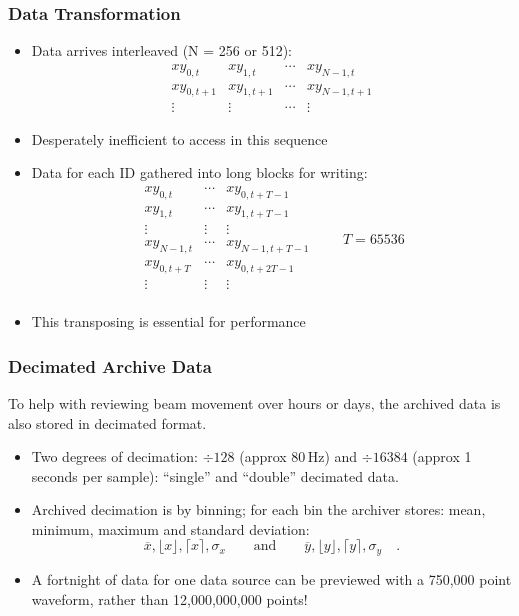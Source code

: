 \documentclass{beamer}
\begin{document}
\begin{frame}\frametitle{Data Transformation}
\begin{itemize}
\item Data arrives interleaved (N = 256 or 512):
\[
\begin{matrix}
xy_{0,t}   & xy_{1, t}   & \cdots & xy_{N-1,t} \\
xy_{0,t+1} & xy_{1, t+1} & \cdots & xy_{N-1,t+1} \\
\vdots & \vdots & \cdots & \vdots
\end{matrix}
\]
\item Desperately inefficient to access in this sequence
\item Data for each ID gathered into long blocks for writing:
\[
\begin{matrix}
xy_{0,t} & \cdots & xy_{0,t+T-1} \\
xy_{1,t} & \cdots & xy_{1,t+T-1} \\
\vdots & \vdots & \vdots \\
xy_{N-1,t} & \cdots & xy_{N-1,t+T-1} \\
xy_{0,t+T} & \cdots & xy_{0,t+2T-1} \\
\vdots & \vdots & \vdots \\
\end{matrix}
\qquad T = 65536
\]
\item This transposing is essential for performance
\end{itemize}

\end{frame}


\begin{frame}\frametitle{Decimated Archive Data}
To help with reviewing beam movement over hours or days, the archived data is
also stored in decimated format.
\begin{itemize}
\item Two degrees of decimation: $\div 128$ (approx 80\,Hz) and $\div 16384$
(approx 1\textonehalf{} seconds per sample): ``single'' and ``double'' decimated
data.
\item Archived decimation is by binning; for each bin the archiver stores: mean,
minimum, maximum and standard deviation:
\[
\overline{x}, \lfloor x\rfloor, \lceil x\rceil, \sigma_x
\qquad\text{and}\qquad
\overline{y}, \lfloor y\rfloor, \lceil y\rceil, \sigma_y
\quad.
\]
\item A fortnight of data for one data source can be previewed with a 750,000
point waveform, rather than 12,000,000,000 points!
\end{itemize}
\end{frame}
\end{document}
